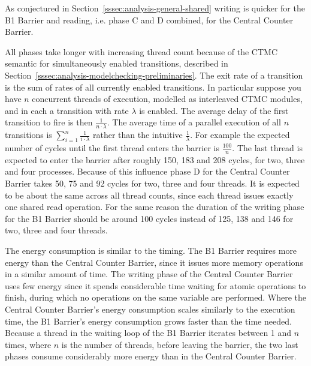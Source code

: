 \documentclass[a4paper, 10pt]{article}
\begin{document}
As conjectured in Section~\ref{sssec:analysis-general-shared} writing is quicker for the B1 Barrier and reading, i.e. phase C and D combined, for the Central Counter Barrier.

All phases take longer with increasing thread count because of the CTMC semantic for simultaneously enabled transitions, described in Section~\ref{sssec:analysis-modelchecking-preliminaries}. The exit rate of a transition is the sum of rates of all currently enabled transitions.
In particular suppose you have $n$ concurrent threads of execution, modelled as interleaved CTMC modules, and in each a transition with rate $\lambda$ is enabled. The average delay of the first transition to fire is then $\frac{1}{n \cdot \lambda}$. The average time of a parallel execution of all $n$ transitions is $\sum_{i=1}^{n} \frac{1}{i \cdot \lambda}$ rather than the intuitive $\frac{1}{\lambda}$.
For example the expected number of cycles until the first thread enters the barrier is $\frac{100}{n}$. The last thread is expected to enter the barrier after roughly 150, 183 and 208 cycles, for two, three and four processes.
Because of this influence phase D for the Central Counter Barrier takes 50, 75 and 92 cycles for two, three and four threads. It is expected to be about the same across all thread counts, since each thread issues exactly one shared read operation.
For the same reason the duration of the writing phase for the B1 Barrier should be around 100 cycles instead of 125, 138 and 146 for two, three and four threads.

The energy consumption is similar to the timing.
The B1 Barrier requires more energy than the Central Counter Barrier, since it issues more memory operations in a similar amount of time.
The writing phase of the Central Counter Barrier uses few energy since it spends considerable time waiting for atomic operations to finish, during which no operations on the same variable are performed.
Where the Central Counter Barrier's energy consumption scales similarly to the execution time, the B1 Barrier's energy consumption grows faster than the time needed.
Because a thread in the waiting loop of the B1 Barrier iterates between 1 and $n$ times, where $n$ is the number of threads, before leaving the barrier, the two last phases consume considerably more energy than in the Central Counter Barrier.
\end{document}
